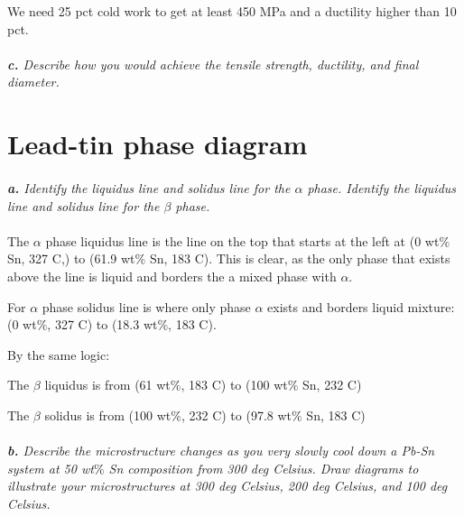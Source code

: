 \documentclass[letterpaper]{article}
\begin{document}
    We need 25 pct cold work to get at least 450 MPa and a ductility higher than 10 pct.

    \paragraph{}
    \textit{
        \textbf{c.} 
        Describe how you would achieve the tensile strength, ductility, and final diameter.
        }


\section{Lead-tin phase diagram}
    \paragraph{}
    \textit{
        \textbf{a.} 
        Identify the liquidus line and solidus line for the $\alpha$ phase. 
        Identify the liquidus line and solidus line for the $\beta$ phase.
        }
        
    \paragraph{}

The $\alpha$ phase liquidus line is the line on the top that starts at the left at (0 wt$\%$ Sn, 327 C,) to (61.9 wt$\%$ Sn, 183 C).
This is clear, as the only phase that exists above the line is liquid and borders the a mixed phase with $\alpha$.

For $\alpha$ phase solidus line is where only phase $\alpha$ exists and borders liquid mixture: (0 wt$\%$, 327 C) to (18.3 wt$\%$, 183 C).

By the same logic:

The $\beta$ liquidus is from (61 wt$\%$, 183 C) to (100 wt$\%$ Sn, 232 C)

The $\beta$ solidus is from (100 wt$\%$, 232 C) to (97.8 wt$\%$ Sn, 183 C)

    \paragraph{}
    \textit{
        \textbf{b.} 
        Describe the microstructure changes as you very slowly cool down a Pb-Sn system at 50 wt$\%$ Sn composition from 300 deg Celsius. 
        Draw diagrams to illustrate your microstructures at 300 deg Celsius, 200 deg Celsius, and 100 deg Celsius.
        }


    \paragraph{}
\end{document}
